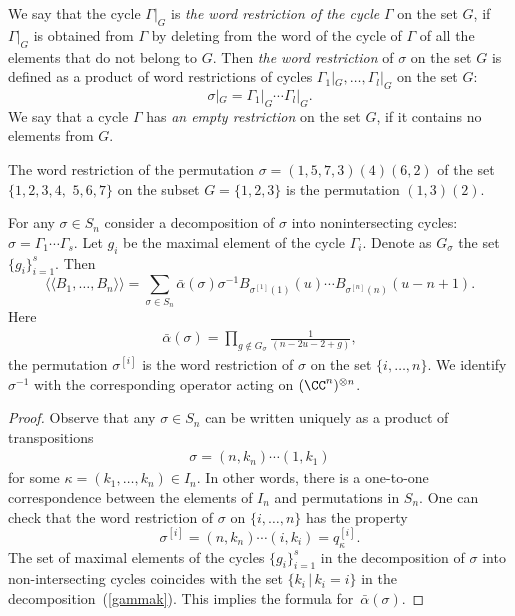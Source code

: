 \begin{definition}
We say that the cycle $\Gamma |_G$ is {\it {the word restriction of  the cycle}}  $\Gamma$ on the set $G$, if~$\Gamma |_G$ is obtained from $\Gamma$ by deleting   from the  word of the cycle of $\Gamma$ of all the elements that do not belong to  $G$.
Then {\it {the word restriction}} of $\sigma$ on the set $G$ is def\/ined as a product of word restrictions of cycles $\Gamma_1|_G, \dots, \Gamma_l|_G $ on the set $G$:
\[
\sigma|_G=
\Gamma_1|_G \cdots \Gamma_l|_G.
\]
We say that a cycle $\Gamma$  has {\it{an empty restriction}} on the set $G$, if it contains no elements from $G$.
 \end{definition}
 \begin{example} The word restriction of the permutation $\sigma =(1,5,7,3)(4)(6,2)$ of the set $\{1,2,3,4,$ $5,6,7\}$ on the subset $G=\{1,2,3\}$
 is  the permutation $(1,3)(2)$.
 \end{example}

\begin{proposition}\label{QC}  For any  $\sigma\in S_n$ consider  a decomposition of $\sigma$  into nonintersecting cycles:
$\sigma = \Gamma_1\cdots \Gamma_s$.
Let $g_i$ be the maximal element of the cycle $\Gamma_i$.   Denote as $G_\sigma$ the set $\{g_i\}_{i=1}^{s}$.
Then
\[
\langle \langle B_1,\dots, B_n\rangle \rangle
=\sum_{\sigma \in S_n }\bar\alpha{(\sigma)} \sigma^{-1} B_{\sigma^{[1]}(1)}(u)\cdots B_{\sigma^{[n]}(n)}(u-n+1).
\]
Here
\begin{gather*}%
\bar\alpha{(\sigma)}=
\prod_{g\notin G_\sigma} \frac{1}{ (n-2u-2+g)},
\end{gather*}
the permutation $\sigma^{[i]}$ is the word restriction of  $\sigma$ on the set $\{i, \dots, n\}$. We identify $\sigma^{-1}$  with the corresponding operator acting on $(\CC^n)^{\otimes n}$.
\end{proposition}


\begin{proof}
Observe that any $\sigma\in S_n $ can be written  uniquely as a product of transpositions
\begin{gather}\label{gammak}
\sigma=(n,k_n)\cdots (1,k_1)
\end{gather}
 for some $\kappa=(k_1,\dots, k_n)\in I_n$. In other words, there  is a one-to-one correspondence between the elements of $I_n$  and permutations in $S_n$. One can check that the word restriction  of $\sigma$ on $\{i,\dots,n\}$  has the property
\[
\sigma^{[i]}=(n,k_n)\cdots (i,k_i)=q^{[i]}_{\kappa}.
\]
The set of   maximal elements  of the cycles  $\{g_{i}\}_{i=1}^{s}$  in the decomposition of $\sigma$ into non-intersecting cycles  coincides with the set $\{k_i\,| \, k_i=i\}$ in  the decomposition~(\ref{gammak}). This implies the formula for~$\bar\alpha(\sigma)$.
\end{proof}


